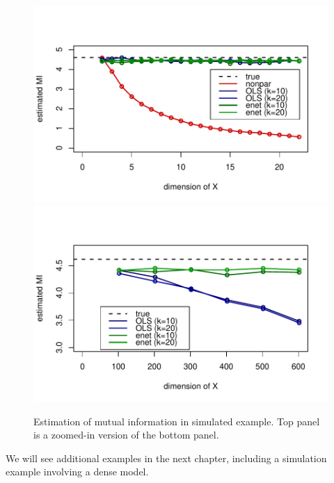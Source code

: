 \begin{figure}
\centering
\includegraphics[scale = 0.8]{../../idloss/sim2a_fig1.pdf}
\includegraphics[scale = 0.8]{../../idloss/sim2a_fig3.pdf}
\caption{Estimation of mutual information in simulated example.  Top
  panel is a zoomed-in version of the bottom panel.}
\label{fig:ch4_simulation}
\end{figure}

We will see additional examples in the next chapter, including a
simulation example involving a dense model.

